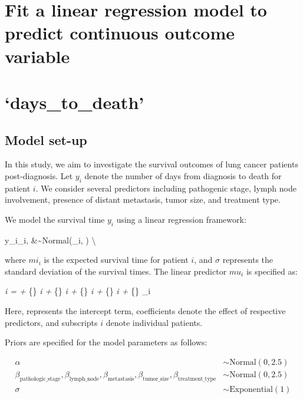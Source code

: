 \documentclass[
  letterpaper,
  DIV=11,
  numbers=noendperiod]{scrartcl}
\begin{document}
\hypertarget{fit-a-linear-regression-model-to-predict-continuous-outcome-variable}{%
\section{Fit a linear regression model to predict continuous outcome
variable}\label{fit-a-linear-regression-model-to-predict-continuous-outcome-variable}}

\hypertarget{days_to_death}{%
\section{`days\_to\_death'}\label{days_to_death}}

\hypertarget{model-set-up}{%
\subsection{Model set-up}\label{model-set-up}}

In this study, we aim to investigate the survival outcomes of lung
cancer patients post-diagnosis. Let \(y_i\) denote the number of days
from diagnosis to death for patient \(i\). We consider several
predictors including pathogenic stage, lymph node involvement, presence
of distant metastasis, tumor size, and treatment type.

We model the survival time \(y_i\) using a linear regression framework:

y\_i\textbar{}\mu\_i, \sigma \&\sim \mbox{Normal}(\mu\_i, \sigma)
\textbackslash{}

where \(mi_i\) is the expected survival time for patient \(i\), and
\(σ\) represents the standard deviation of the survival times. The
linear predictor \(mu_i\) is specified as:

\mu\emph{i = \alpha + \beta}\{\}
\times {}\emph{i + \beta}\{\}
\times {}\emph{i +
\beta}\{\}
\times {}\emph{i +
\beta}\{\} \times {}\emph{i +
\beta}\{\} \times {}\_i

Here, \alpha represents the intercept term, \beta coefficients denote
the effect of respective predictors, and subscripts \(i\) denote
individual patients.

Priors are specified for the model parameters as follows:

\begin{align*}
\alpha &\sim \text{Normal}(0, 2.5) \\
\beta_{\text{pathologic_stage}}, \beta_{\text{lymph_node}}, \beta_{\text{metastasis}}, \beta_{\text{tumor_size}}, \beta_{\text{treatment_type}} &\sim \text{Normal}(0, 2.5) \\
\sigma &\sim \text{Exponential}(1)
\end{align*}
\end{document}

